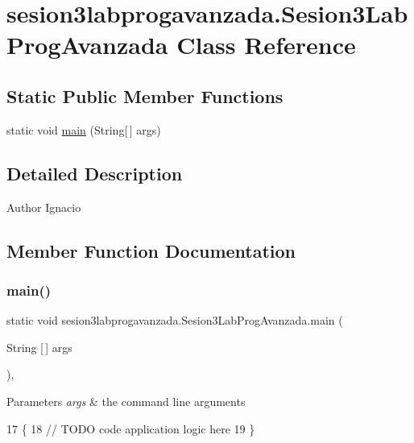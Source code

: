 \hypertarget{classsesion3labprogavanzada_1_1_sesion3_lab_prog_avanzada}{}\section{sesion3labprogavanzada.\+Sesion3\+Lab\+Prog\+Avanzada Class Reference}
\label{classsesion3labprogavanzada_1_1_sesion3_lab_prog_avanzada}
\subsection*{Static Public Member Functions}
\begin{DoxyCompactItemize}
\item 
static void \mbox{\hyperlink{classsesion3labprogavanzada_1_1_sesion3_lab_prog_avanzada_a9b582927dc376b9282a93be6e38a3684}{main}} (String\mbox{[}$\,$\mbox{]} args)
\end{DoxyCompactItemize}


\subsection{Detailed Description}
\begin{DoxyAuthor}{Author}
Ignacio 
\end{DoxyAuthor}


\subsection{Member Function Documentation}
\mbox{\label{classsesion3labprogavanzada_1_1_sesion3_lab_prog_avanzada_a9b582927dc376b9282a93be6e38a3684}} 
\subsubsection{\texorpdfstring{main()}{main()}}
{\footnotesize\ttfamily static void sesion3labprogavanzada.\+Sesion3\+Lab\+Prog\+Avanzada.\+main (\begin{DoxyParamCaption}\item[{String \mbox{[}$\,$\mbox{]}}]{args }\end{DoxyParamCaption})\hspace{0.3cm}{\ttfamily [inline]}, {\ttfamily [static]}}


\begin{DoxyParams}{Parameters}
{\em args} & the command line arguments \\
\hline
\end{DoxyParams}

\begin{DoxyCode}
17                                            \{
18         \textcolor{comment}{// TODO code application logic here}
19     \}
\end{DoxyCode}
